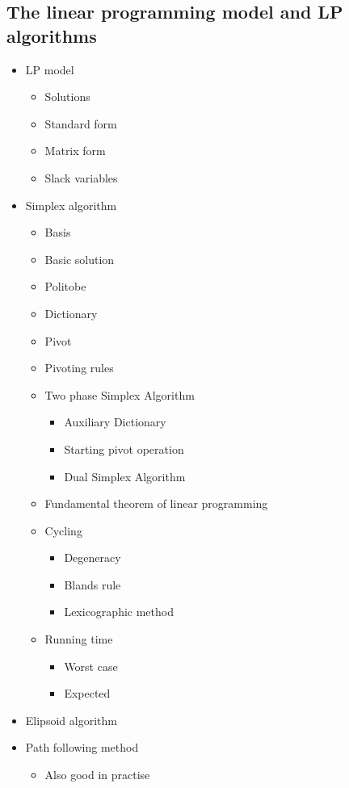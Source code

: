 \documentclass[11pt]{article}
\begin{document}
\subsection{The linear programming model and LP algorithms}
\label{sec:org2b5d2eb}
\begin{itemize}
\item LP model
\begin{itemize}
\item Solutions
\item Standard form
\item Matrix form
\item Slack variables
\end{itemize}

\item Simplex algorithm
\begin{itemize}
\item Basis
\item Basic solution
\item Politobe
\item Dictionary
\item Pivot
\item Pivoting rules
\item Two phase Simplex Algorithm
\begin{itemize}
\item Auxiliary Dictionary
\item Starting pivot operation
\item Dual Simplex Algorithm
\end{itemize}
\item Fundamental theorem of linear programming
\item Cycling
\begin{itemize}
\item Degeneracy
\item Blands rule
\item Lexicographic method
\end{itemize}
\item Running time
\begin{itemize}
\item Worst case
\item Expected
\end{itemize}
\end{itemize}

\item Elipsoid algorithm
\item Path following method
\begin{itemize}
\item Also good in practise
\end{itemize}
\end{itemize}
\end{document}
